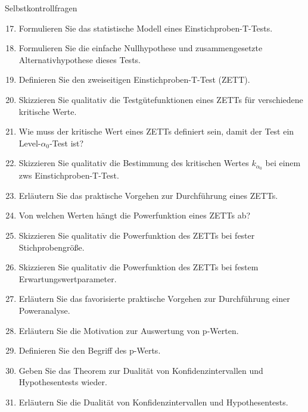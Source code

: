 \documentclass[
  8pt,
  ignorenonframetext,
]{beamer}
\providecommand{\tightlist}{%
  \setlength{\itemsep}{0pt}\setlength{\parskip}{0pt}}
\begin{document}
\begin{frame}{Selbstkontrollfragen}
\protect\hypertarget{selbstkontrollfragen-1}{}
\footnotesize

\begin{enumerate}
\setcounter{enumi}{16}
\tightlist
\item
  \justifying Formulieren Sie das statistische Modell eines
  Einstichproben-T-Tests.
\item
  Formulieren Sie die einfache Nullhypothese und zusammengesetzte
  Alternativhypothese dieses Tests.
\item
  Definieren Sie den zweiseitigen Einstichproben-T-Test (ZETT).
\item
  Skizzieren Sie qualitativ die Testgütefunktionen eines ZETTs für
  verschiedene kritische Werte.
\item
  Wie muss der kritische Wert eines ZETTs definiert sein, damit der Test
  ein Level-\(\alpha_0\)-Test ist?
\item
  Skizzieren Sie qualitativ die Bestimmung des kritischen Wertes
  \(k_{\alpha_0}\) bei einem zws Einstichproben-T-Test.
\item
  Erläutern Sie das praktische Vorgehen zur Durchführung eines ZETTs.
\item
  Von welchen Werten hängt die Powerfunktion eines ZETTs ab?
\item
  Skizzieren Sie qualitativ die Powerfunktion des ZETTs bei fester
  Stichprobengröße.
\item
  Skizzieren Sie qualitativ die Powerfunktion des ZETTs bei festem
  Erwartungswertparameter.
\item
  Erläutern Sie das favorisierte praktische Vorgehen zur Durchführung
  einer Poweranalyse.
\item
  Erläutern Sie die Motivation zur Auswertung von p-Werten.
\item
  Definieren Sie den Begriff des p-Werts.
\item
  Geben Sie das Theorem zur Dualität von Konfidenzintervallen und
  Hypothesentests wieder.
\item
  Erläutern Sie die Dualität von Konfidenzintervallen und
  Hypothesentests.
\end{enumerate}
\end{frame}
\end{document}
